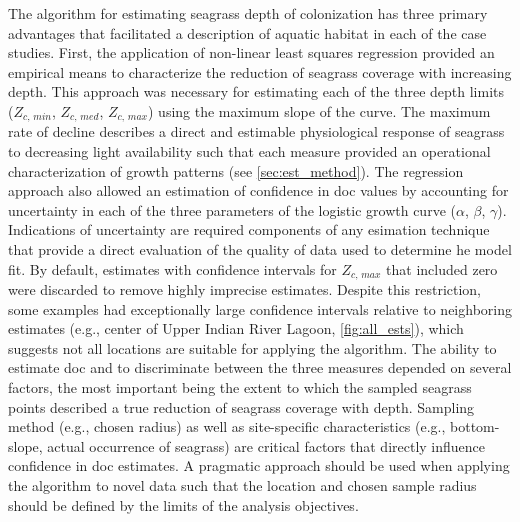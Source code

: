\documentclass[letterpaper,12pt,oneside]{article}\usepackage[]{graphicx}\usepackage[]{color}
\begin{document}
The algorithm for estimating seagrass depth of colonization has three primary advantages that facilitated a description of aquatic habitat in each of the case studies.  First, the application of non-linear least squares regression provided an empirical means to characterize the reduction of seagrass coverage with increasing depth.  This approach was necessary for estimating each of the three depth limits ($Z_{c,\,min}$, $Z_{c,\,med}$, $Z_{c,\,max}$) using the maximum slope of the curve.  The maximum rate of decline describes a direct and estimable physiological response of seagrass to decreasing light availability such that each measure provided an operational characterization of growth patterns (see \cref{sec:est_method}).  The regression approach also allowed an estimation of confidence in \ac{doc} values by accounting for uncertainty in each of the three parameters of the logistic growth curve ($\alpha$, $\beta$, $\gamma$). Indications of uncertainty are required components of any esimation technique that provide a direct evaluation of the quality of data used to determine he model fit.  By default, estimates with confidence intervals for $Z_{c,\,max}$ that included zero were discarded to remove highly imprecise estimates.  Despite this restriction, some examples had exceptionally large confidence intervals relative to neighboring estimates (e.g., center of Upper Indian River Lagoon, \cref{fig:all_ests}), which suggests not all locations are suitable for applying the algorithm. The ability to estimate \ac{doc} and to discriminate between the three measures depended on several factors, the most important being the extent to which the sampled seagrass points described a true reduction of seagrass coverage with depth.  Sampling method (e.g., chosen radius) as well as site-specific characteristics (e.g., bottom-slope, actual occurrence of seagrass) are critical factors that directly influence confidence in \ac{doc} estimates.  A pragmatic approach should be used when applying the algorithm to novel data such that the location and chosen sample radius should be defined by the limits of the analysis objectives. 
\end{document}
